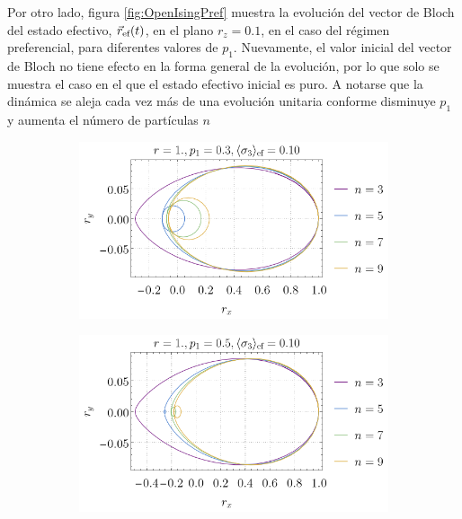 Por otro lado, figura \ref{fig:OpenIsingPref} muestra la evolución del vector de Bloch del estado efectivo, $\vec{r}_{\text{ef}}(t)$, en el plano $r_{z}=0.1$, en el caso del régimen preferencial, para diferentes valores de $p_{1}$. Nuevamente, el valor inicial del vector de Bloch no tiene efecto en la forma general de la evolución, por lo que solo se muestra el caso en el que el estado efectivo inicial es puro. A notarse que la dinámica se aleja cada vez más de una evolución unitaria conforme disminuye $p_{1}$ y aumenta el número de partículas $n$

\begin{figure}
    \centering
    \begin{subfigure}[b]{0.475\textwidth}
        \centering
        \includegraphics[width=\textwidth]{chapter3/figures_special/Ising_Pref_p1=0.3_z=0.10.png}
    \end{subfigure}
    \hfill
    \begin{subfigure}[b]{0.475\textwidth}  
        \centering 
        \includegraphics[width=\textwidth]{chapter3/figures_special/Ising_Pref_p1=0.5_z=0.10.png}
    \end{subfigure}

\end{figure}
